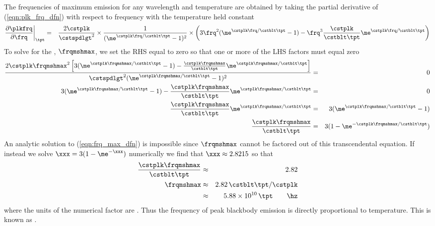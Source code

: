 \documentclass[12pt]{article}
\begin{document}
The frequencies of maximum emission for any wavelength and temperature are obtained by taking
the partial derivative of (\ref{eqn:plk_frq_dfn}) with respect to
frequency with the temperature held constant
\begin{eqnarray}
\frac{\partial \plkfrq}{\partial \frq} 
\bigg|_{\tpt}
& = &
\frac{2 \cstplk}{\cstspdlgt^{2}} \times
\frac{1}{( \me^{\cstplk \frq / \cstblt \tpt}- 1)^{2}} \times
\left( 3 \frq^{2} ( \me^{\cstplk \frq / \cstblt \tpt}- 1) -
\frq^{3} \frac{\cstplk}{\cstblt \tpt} \me^{\cstplk \frq / \cstblt \tpt} \right)
\nonumber
\end{eqnarray}
To solve for the , $\frqmshmax$, 
we set the RHS equal to zero so that one or more of the LHS factors
must equal zero 
\begin{eqnarray}
\frac{2 \cstplk \frqmshmax^{2}
\left[ 3 ( \me^{\cstplk \frqmshmax / \cstblt \tpt}- 1 ) -
\frac{\cstplk \frqmshmax}{\cstblt \tpt} \me^{\cstplk \frqmshmax / \cstblt \tpt} \right] }
{\cstspdlgt^{2} ( \me^{\cstplk \frqmshmax / \cstblt \tpt}- 1)^{2}}
& = & 0
\nonumber \\
3 ( \me^{\cstplk \frqmshmax / \cstblt \tpt}- 1 ) -
\frac{\cstplk \frqmshmax}{\cstblt \tpt} \me^{\cstplk \frqmshmax / \cstblt \tpt}
& = & 0
\nonumber \\
\frac{\cstplk \frqmshmax}{\cstblt \tpt} \me^{\cstplk \frqmshmax / \cstblt \tpt}
& = &
3 ( \me^{\cstplk \frqmshmax / \cstblt \tpt}- 1 )
\nonumber \\
\frac{\cstplk \frqmshmax}{\cstblt \tpt}
& = &
3 ( 1 - \me^{-\cstplk \frqmshmax / \cstblt \tpt})
\label{eqn:frq_max_dfn}
\end{eqnarray}
An analytic solution to (\ref{eqn:frq_max_dfn}) is impossible since
$\frqmshmax$ cannot be factored out of this transcendental equation.
If instead we solve $\xxx = 3 ( 1 - \me^{-\xxx})$ numerically we find
that $\xxx \approx 2.8215$ so that 
\begin{eqnarray}
\frac{\cstplk \frqmshmax}{\cstblt \tpt} & \approx & 2.82 \nonumber \\
\frqmshmax & \approx & 2.82 \, \cstblt \tpt / \cstplk \nonumber \\
& \approx & 5.88 \times 10^{10} \, \tpt \qquad\mbox{\hz}
\label{eqn:frq_max_apx}
\end{eqnarray}
where the units of the numerical factor are \hzxk.
Thus the frequency of peak blackbody emission is directly
proportional to temperature.
This is known as .
\end{document}
